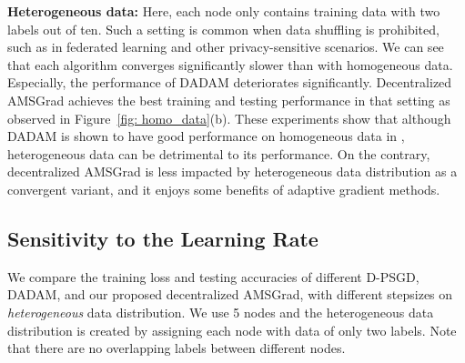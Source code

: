 \documentclass[11pt]{article}
\begin{document}
\vspace{0.1in}
\noindent\textbf{Heterogeneous data:}
Here, each node only contains training data with two labels out of ten. {Such a setting is common when data shuffling is prohibited, such as in  federated learning and other privacy-sensitive scenarios.}
We can see that each algorithm converges significantly slower than with homogeneous data. 
Especially, the performance of DADAM deteriorates significantly. 
Decentralized AMSGrad achieves the best training and testing performance in that setting as observed in Figure~\ref{fig: homo_data}(b). These experiments show that although DADAM is shown to have good performance on homogeneous data in 
 \citet{nazari2019dadam}, heterogeneous data can be detrimental to its performance. On the contrary, decentralized AMSGrad is less impacted by heterogeneous data distribution as a convergent variant, and it enjoys some benefits of adaptive gradient methods.
 
\subsection{Sensitivity to the Learning Rate}

We compare the training loss and testing accuracies of different D-PSGD, DADAM, and our proposed decentralized AMSGrad,  with different stepsizes on \emph{heterogeneous} data distribution. 
We use 5 nodes and the heterogeneous data distribution is created by assigning each node with data of only two labels.
Note that there are no overlapping labels between different nodes. 
\end{document}

